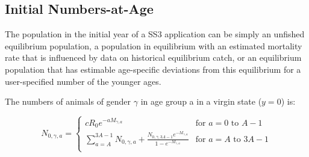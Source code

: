 \documentclass[11pt,
  english,
  letterpaper,
]{article}
\begin{document}
\leavevmode\tagmcend\tagstructend\par


\hypertarget{initial-numbers-at-age}{%
\subsection{Initial Numbers-at-Age}\label{initial-numbers-at-age}}

\leavevmode\tagmcend\tagstructend


The population in the initial year of a SS3 application can be simply an unfished equilibrium population, a population in equilibrium with an estimated mortality rate that is influenced by data on historical equilibrium catch, or an equilibrium population that has estimable age-specific deviations from this equilibrium for a user-specified number of the younger ages.

\leavevmode\tagmcend\tagstructend\par


The numbers of animals of gender {\(\gamma\)\leavevmode\tagmcend\tagstructend} in age group a in a virgin state ({\(y=0\)\leavevmode\tagmcend\tagstructend}) is:

\leavevmode\tagmcend\tagstructend\par


\begin{equation}
\label{eqn1}
N_{0,\gamma,a} =
\begin{cases}
cR_0e^{-aM_{\gamma,a}} & \text{for $a=0$ to $A-1$} \\
\sum_{a=A}^{3A-1}N_{0,\gamma,a} + \frac{N_{0,\gamma,3A-1}e^{-M_{\gamma,a}}}{1-e^{-M_{\gamma,a}}} & \text{for $a=A$ to $3A-1$}\\
\end{cases}
\end{equation}

\leavevmode\tagmcend\tagstructend\par

\end{document}
